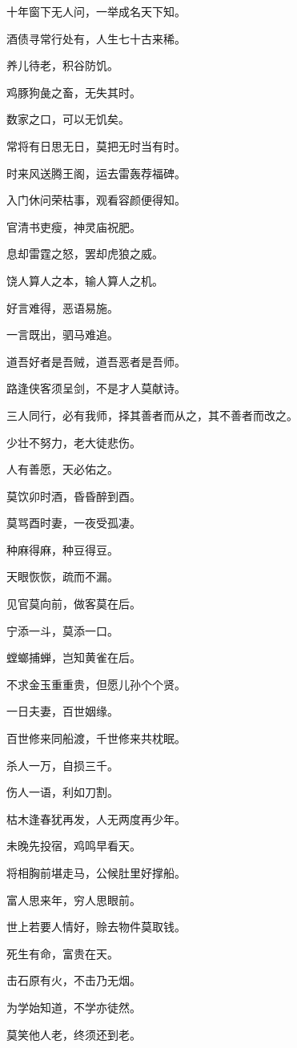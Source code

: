 \documentclass[12pt,oneside]{book}
\begin{document}
十年窗下无人问，一举成名天下知。

酒债寻常行处有，人生七十古来稀。

养儿待老，积谷防饥。

鸡豚狗彘之畜，无失其时。

数家之口，可以无饥矣。

常将有日思无日，莫把无时当有时。

时来风送腾王阁，运去雷轰荐福碑。

入门休问荣枯事，观看容颜便得知。

官清书吏瘦，神灵庙祝肥。

息却雷霆之怒，罢却虎狼之威。

饶人算人之本，输人算人之机。

好言难得，恶语易施。

一言既出，驷马难追。

道吾好者是吾贼，道吾恶者是吾师。

路逢侠客须呈剑，不是才人莫献诗。

三人同行，必有我师，择其善者而从之，其不善者而改之。

少壮不努力，老大徒悲伤。

人有善愿，天必佑之。

莫饮卯时酒，昏昏醉到酉。

莫骂酉时妻，一夜受孤凄。

种麻得麻，种豆得豆。

天眼恢恢，疏而不漏。

见官莫向前，做客莫在后。

宁添一斗，莫添一口。

螳螂捕蝉，岂知黄雀在后。

不求金玉重重贵，但愿儿孙个个贤。

一日夫妻，百世姻缘。

百世修来同船渡，千世修来共枕眠。

杀人一万，自损三千。

伤人一语，利如刀割。

枯木逢春犹再发，人无两度再少年。

未晚先投宿，鸡鸣早看天。

将相胸前堪走马，公候肚里好撑船。

富人思来年，穷人思眼前。

世上若要人情好，赊去物件莫取钱。

死生有命，富贵在天。

击石原有火，不击乃无烟。

为学始知道，不学亦徒然。

莫笑他人老，终须还到老。
\end{document}
